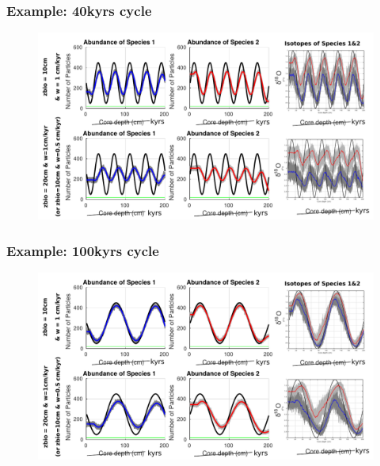 \documentclass{beamer}
\begin{document}
\begin{frame}
\frametitle{Example: 40kyrs cycle}
\begin{figure}[hbtp]
\hspace*{-0.8cm}\includegraphics[width=1.1\textwidth]{figures/40kyrcycle_10+20cm_background.pdf}%
\end{figure}
\end{frame}

\begin{frame}
\frametitle{Example: 100kyrs cycle}
\begin{figure}[hbtp]
\hspace*{-0.8cm}\includegraphics[width=1.1\textwidth]{figures/100kyrcycle_10+20cm_background.pdf}%
\end{figure}
\end{frame}
\end{document}
